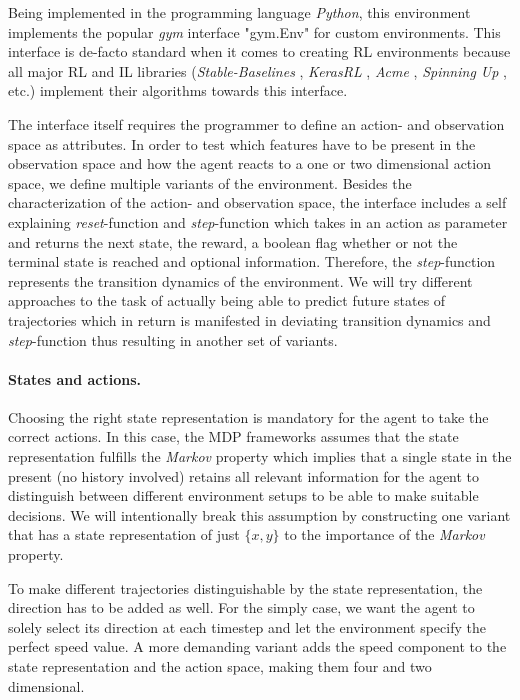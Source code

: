 Being implemented in the programming language \textit{Python}, this environment implements the popular \textit{gym} interface "gym.Env" \cite[]{gym} for custom environments. This interface is de-facto standard when it comes to creating RL environments because all major RL and IL libraries (\textit{Stable-Baselines} \cite[]{stable-baselines3}, \textit{KerasRL} \cite[]{plappert2016kerasrl}, \textit{Acme} \cite[]{hoffman2020acme}, \textit{Spinning Up} \cite[]{SpinningUp2018}, etc.) implement their algorithms towards this interface.
\par
The interface itself requires the programmer to define an action- and observation space as attributes. In order to test which features have to be present in the observation space and how the agent reacts to a one or two dimensional action space, we define multiple variants of the environment. Besides the characterization of the action- and observation space, the interface includes a self explaining \textit{reset}-function and \textit{step}-function which takes in an action as parameter and returns the next state, the reward, a boolean flag whether or not the terminal state is reached and optional information. Therefore, the \textit{step}-function represents the transition dynamics of the environment. We will try different approaches to the task of actually being able to predict future states of trajectories which in return is manifested in deviating transition dynamics and \textit{step}-function thus resulting in another set of variants.

\paragraph{States and actions.} Choosing the right state representation is mandatory for the agent to take the correct actions. In this case, the MDP frameworks assumes that the state representation fulfills the \textit{Markov} property which implies that a single state in the present (no history involved) retains all relevant information for the agent to distinguish between different environment setups to be able to make suitable decisions. We will intentionally break this assumption by constructing one variant that has a state representation of just $\{x,y\}$ to the importance of the \textit{Markov} property.
\par
To make different trajectories distinguishable by the state representation, the direction has to be added as well. For the simply case, we want the agent to solely select its direction at each timestep and let the environment specify the perfect speed value. A more demanding variant adds the speed component to the state representation and the action space, making them four and two dimensional.

